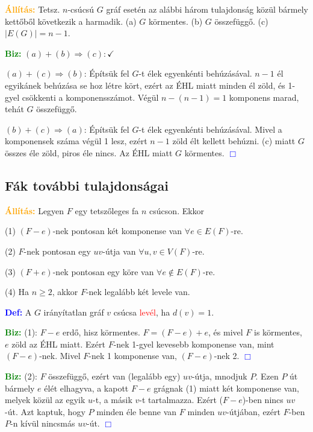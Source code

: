 \documentclass[../szamtud.tex]{subfiles}
\begin{document}
        \textcolor{orange}{\textbf{Állítás:}} Tetsz. $n$-csúcsú $G$ gráf esetén az alábbi három tulajdonság közül bármely kettőből következik a harmadik. (a) $G$ körmentes. \qquad (b) $G$ összefüggő. \qquad (c) $|E(G)|=n-1$. 

        \textcolor{green}{\textbf{Biz:}} $(a)+(b) \Rightarrow (c): \checkmark$

        $(a)+(c)\Rightarrow (b)$: Építsük fel $G$-t élek egyenkénti behúzásával. $n-1$ él egyikánek behúzása se hoz létre kört, ezért az ÉHL miatt minden él zöld, és 1-gyel csökkenti a komponensszámot. Végül $n-(n-1)=1$ komponens marad, tehát $G$ összefüggő.

        $(b)+(c) \Rightarrow (a)$: Építsük fel $G$-t élek egyenkénti behúzásával. Mivel a komponensek száma végül 1 lesz, ezért $n-1$ zöld élt kellett behúzni. (c) miatt $G$ összes éle zöld, piros éle nincs. Az ÉHL miatt $G$ körmentes. \textcolor{blue}{$\Box$} 

    \subsection{Fák további tulajdonságai}

        \textcolor{orange}{\textbf{Állítás:}} Legyen $F$ egy tetszőleges fa $n$ csúcson. Ekkor 

        (1) $(F-e)$-nek pontosan két komponense van $\forall e\in E(F)$-re.

        (2) $F$-nek pontosan egy $uv$-útja van $\forall u,v\in V(F)$-re.

        (3) $(F+e)$-nek pontosan egy köre van $\forall e\notin E(F)$-re.

        (4) Ha $n \geq 2$, akkor $F$-nek legalább két levele van.

        \textcolor{blue}{\textbf{Def:}} A $G$ irányítatlan gráf $v$ csúcsa \textcolor{red}{levél}, ha $d(v)=1$.

        \textcolor{green}{\textbf{Biz:}} (1): $F-e$ erdő, hisz körmentes. $F=(F-e)+e$, és mivel $F$ is körmentes, $e$ zöld az ÉHL miatt. Ezért $F$-nek 1-gyel kevesebb komponense van, mint $(F-e)$-nek. Mivel $F$-nek 1 komponense van, $(F-e)$-nek 2. \textcolor{blue}{$\Box$} 
    
        \textcolor{green}{\textbf{Biz:}} (2): $F$ összefüggő, ezért van (legalább egy) $uv$-útja, mnodjuk $P$. Ezen $P$ út bármely $e$ élét elhagyva, a kapott $F-e$ grágnak (1) miatt két komponense van, melyek közül az egyik $u$-t, a másik $v$-t tartalmazza. Ezért ($F-e$)-ben nincs $uv$-út. Azt kaptuk, hogy $P$ minden éle benne van $F$ minden $uv$-útjában, ezért $F$-ben $P$-n kívül nincsmás $uv$-út. \textcolor{blue}{$\Box$} 
    
\end{document}
